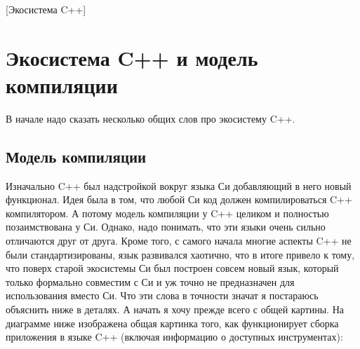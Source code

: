 [Экосистема C++]


\section{Экосистема C++ и модель компиляции}

В начале надо сказать несколько общих слов про экосистему C++.

\subsection{Модель компиляции}

Изначально C++ был надстройкой вокруг языка Си добавляющий в него новый функционал.
Идея была в том, что любой Си код должен компилироваться C++ компилятором.
А потому модель компиляции у C++ целиком и полностью позаимствована у Си.
Однако, надо понимать, что эти языки очень сильно отличаются друг от друга.
Кроме того, с самого начала многие аспекты C++ не были стандартизированы, язык развивался хаотично, что в итоге привело к тому, что поверх старой экосистемы Си был построен совсем новый язык, который только формально совместим с Си и уж точно не предназначен для использования вместо Си.
Что эти слова в точности значат я постараюсь объяснить ниже в деталях.
А начать я хочу прежде всего с общей картины.
На диаграмме ниже изображена общая картинка того, как функционирует сборка приложения в языке C++ (включая информацию о доступных инструментах):
